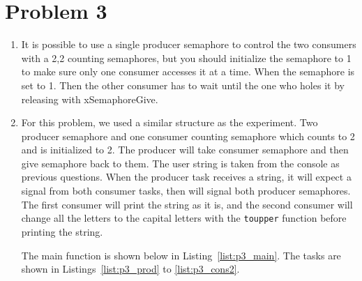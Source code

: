 \section*{Problem 3}
\begin{enumerate}
\item
It is possible to use a single producer semaphore to control the two consumers with a 2,2 counting semaphores, but you should initialize the semaphore to 1 to make sure only one consumer accesses it at a time. When the semaphore is set to 1. Then the other consumer has to wait until the one who holes it by releasing with xSemaphoreGive.

\item
For this problem, we used a similar structure as the experiment. Two producer semaphore and one consumer counting semaphore which counts to 2 and is initialized to 2. The producer will take consumer semaphore and then give semaphore back to them. The user string is taken from the console as previous questions. When the producer task receives a string, it will expect a signal from both consumer tasks, then will signal both producer semaphores. The first consumer will print the string as it is, and the second consumer will change all the letters to the capital letters with the \texttt{toupper} function before printing the string.

The main function is shown below in Listing~\ref{list:p3_main}. The tasks are shown in Listings~\ref{list:p3_prod} to \ref{list:p3_cons2}.






\end{enumerate}